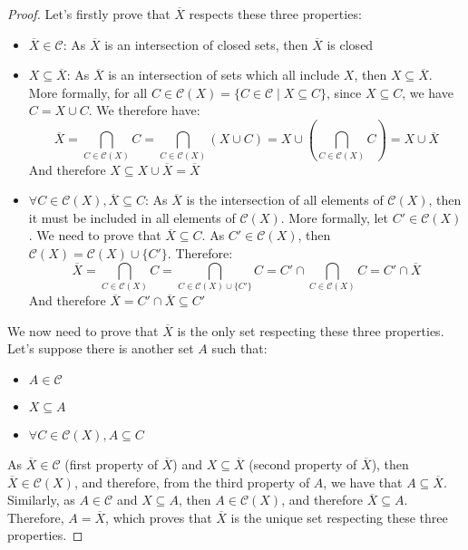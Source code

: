 \documentclass{article}
\theoremstyle{definition}
\theoremstyle{remark}
\theoremstyle{example}
\theoremstyle{notation}
\newcommand{\closed}{\mathcal{C}}
\begin{document}
\begin{proof}
		Let's firstly prove that $\overline{X}$ respects these three properties:
		\begin{itemize}
				\item $\overline{X} \in \closed$: As $\overline{X}$ is an intersection of closed sets, then $\overline{X}$ is closed
				\item $X \subseteq \overline{X}$: As $\overline{X}$ is an intersection of sets which all include $X$, then $X \subseteq \overline{X}$. More formally, for all $C \in \closed(X) = \{C \in \closed \mid X \subseteq C\}$, since $X \subseteq C$, we have $C = X \cup C$. We therefore have:
						$$\overline{X} = \bigcap_{C \in \closed(X)} C = \bigcap_{C \in \closed(X)} (X \cup C) = X \cup (\bigcap_{C \in \closed(X)} C) = X \cup \overline{X}$$
				And therefore $X \subseteq X \cup \overline{X} = \overline{X}$
				\item $\forall C \in \closed(X), \overline{X} \subseteq C$: As $\overline{X}$ is the intersection of all elements of $\closed(X)$, then it must be included in all elements of $\closed(X)$. More formally, let $C' \in \closed(X)$. We need to prove that $\overline{X} \subseteq C$. As $C' \in \closed(X)$, then $\closed(X) = \closed(X) \cup \{C'\}$. Therefore:
						$$\overline{X} = \bigcap_{C \in \closed(X)} C = \bigcap_{C \in \closed(X) \cup \{C'\}} C = C' \cap \bigcap_{C \in \closed(X)} C = C' \cap \overline{X}$$
				And therefore $\overline{X} = C' \cap \overline{X} \subseteq C'$
		\end{itemize}
		We now need to prove that $\overline{X}$ is the only set respecting these three properties. Let's suppose there is another set $A$ such that:
		\begin{itemize}
				\item $A \in \closed$
				\item $X \subseteq A$
				\item $\forall C \in \closed(X), A \subseteq C$
		\end{itemize}
		As $\overline{X} \in \closed$ (first property of $\overline{X}$) and $X \subseteq \overline{X}$ (second property of $\overline{X}$), then $\overline{X} \in \closed(X)$, and therefore, from the third property of $A$, we have that $A \subseteq \overline{X}$. Similarly, as $A \in \closed$ and $X \subseteq A$, then $A \in \closed(X)$, and therefore $\overline{X} \subseteq A$. Therefore, $A = \overline{X}$, which proves that $\overline{X}$ is the unique set respecting these three properties.
\end{proof}
\end{document}
